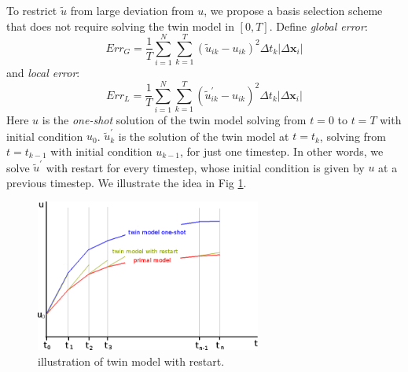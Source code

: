 \documentclass[a4paper,onecolumn]{article}
\theoremstyle{remark}
\begin{document}
\noindent 
To restrict $\tilde{u}$ from large deviation from $u$, we propose a basis selection scheme
that does not require solving the twin model in $[0,T]$.
Define \emph{global error}:
\begin{equation}
    Err_{G} = 
    \frac{1}{T}\sum_{i=1}^{N}\sum_{k=1}^{T} \left(\tilde{u}_{ik} - u_{ik}\right)^2 \Delta t_k
    \left| \Delta \mathbf{x}_i \right|
    \label{global error}
\end{equation}
and \emph{local error}:
\begin{equation}
    Err_{L} = 
    \frac{1}{T}\sum_{i=1}^{N}\sum_{k=1}^{T} \left(\tilde{u}^\prime_{ik} - u_{ik}\right)^2 \Delta t_k
    \left| \Delta \mathbf{x}_i \right|
    \label{local error}
\end{equation}
Here $u$ is the \emph{one-shot} solution of the 
twin model solving from $t=0$ to $t=T$ with initial condition $u_0$.
$\tilde{u}^\prime_k$ is the solution of the twin model at $t=t_{k}$, solving from $t=t_{k-1}$
with initial condition $u_{k-1}$, for just one timestep. In other words, 
we solve $\tilde{u}^\prime$ with restart for every timestep, whose
initial condition is given by $u$ at a previous timestep.
We illustrate the idea in Fig \ref{fig:tmodelrestart}.
\begin{figure}[H]\begin{center}
    \includegraphics[height=5cm]{sketch2.png}
    \caption{illustration of twin model with restart.}
    \label{fig:tmodelrestart}
\end{center}
\end{figure}
\end{document}
